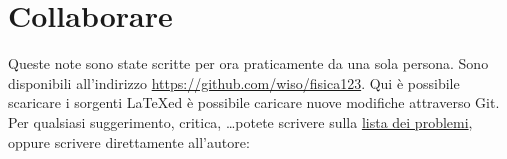 \section*{\centering Collaborare}
Queste note sono state scritte per ora praticamente da una sola persona. Sono disponibili all'indirizzo \href{https://github.com/wiso/fisica123}{https://github.com/wiso/fisica123}. Qui è possibile scaricare i sorgenti \LaTeX ed è possibile caricare nuove modifiche attraverso Git. Per qualsiasi suggerimento, critica, \ldots potete scrivere sulla  \href{https://github.com/wiso/fisica123/issues}{lista dei problemi}, oppure scrivere direttamente all'autore:
\begin{center}
\end{center}
\rmfamily\upshape